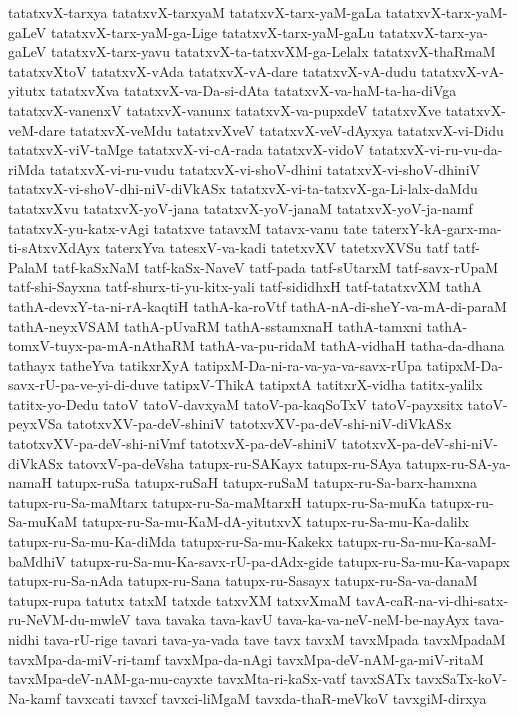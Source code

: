 {tatatxvX-tarxya
tatatxvX-tarxyaM
tatatxvX-tarx-yaM-gaLa
tatatxvX-tarx-yaM-gaLeV
tatatxvX-tarx-yaM-ga-Lige
tatatxvX-tarx-yaM-gaLu
tatatxvX-tarx-ya-gaLeV
tatatxvX-tarx-yavu
tatatxvX-ta-tatxvXM-ga-Lelalx
tatatxvX-thaRmaM
tatatxvXtoV
tatatxvX-vAda
tatatxvX-vA-dare
tatatxvX-vA-dudu
tatatxvX-vA-yitutx
tatatxvXva
tatatxvX-va-Da-si-dAta
tatatxvX-va-haM-ta-ha-diVga
tatatxvX-vanenxV
tatatxvX-vanunx
tatatxvX-va-pupxdeV
tatatxvXve
tatatxvX-veM-dare
tatatxvX-veMdu
tatatxvXveV
tatatxvX-veV-dAyxya
tatatxvX-vi-Didu
tatatxvX-viV-taMge
tatatxvX-vi-cA-rada
tatatxvX-vidoV
tatatxvX-vi-ru-vu-da-riMda
tatatxvX-vi-ru-vudu
tatatxvX-vi-shoV-dhini
tatatxvX-vi-shoV-dhiniV
tatatxvX-vi-shoV-dhi-niV-diVkASx
tatatxvX-vi-ta-tatxvX-ga-Li-lalx-daMdu
tatatxvXvu
tatatxvX-yoV-jana
tatatxvX-yoV-janaM
tatatxvX-yoV-ja-namf
tatatxvX-yu-katx-vAgi
tatatxve
tatavxM
tatavx-vanu
tate
taterxY-kA-garx-ma-ti-sAtxvXdAyx
taterxYva
tatesxV-va-kadi
tatetxvXV
tatetxvXVSu
tatf
tatf-PalaM
tatf-kaSxNaM
tatf-kaSx-NaveV
tatf-pada
tatf-sUtarxM
tatf-savx-rUpaM
tatf-shi-Sayxna
tatf-shurx-ti-yu-kitx-yali
tatf-sididhxH
tatf-tatatxvXM
tathA
tathA-devxY-ta-ni-rA-kaqtiH
tathA-ka-roVtf
tathA-nA-di-sheY-va-mA-di-paraM
tathA-neyxVSAM
tathA-pUvaRM
tathA-sstamxnaH
tathA-tamxni
tathA-tomxV-tuyx-pa-mA-nAthaRM
tathA-va-pu-ridaM
tathA-vidhaH
tatha-da-dhana
tathayx
tatheYva
tatikxrXyA
tatipxM-Da-ni-ra-va-ya-va-savx-rUpa
tatipxM-Da-savx-rU-pa-ve-yi-di-duve
tatipxV-ThikA
tatipxtA
tatitxrX-vidha
tatitx-yalilx
tatitx-yo-Dedu
tatoV
tatoV-davxyaM
tatoV-pa-kaqSoTxV
tatoV-payxsitx
tatoV-peyxVSa
tatotxvXV-pa-deV-shiniV
tatotxvXV-pa-deV-shi-niV-diVkASx
tatotxvXV-pa-deV-shi-niVmf
tatotxvX-pa-deV-shiniV
tatotxvX-pa-deV-shi-niV-diVkASx
tatovxV-pa-deVsha
tatupx-ru-SAKayx
tatupx-ru-SAya
tatupx-ru-SA-ya-namaH
tatupx-ruSa
tatupx-ruSaH
tatupx-ruSaM
tatupx-ru-Sa-barx-hamxna
tatupx-ru-Sa-maMtarx
tatupx-ru-Sa-maMtarxH
tatupx-ru-Sa-muKa
tatupx-ru-Sa-muKaM
tatupx-ru-Sa-mu-KaM-dA-yitutxvX
tatupx-ru-Sa-mu-Ka-dalilx
tatupx-ru-Sa-mu-Ka-diMda
tatupx-ru-Sa-mu-Kakekx
tatupx-ru-Sa-mu-Ka-saM-baMdhiV
tatupx-ru-Sa-mu-Ka-savx-rU-pa-dAdx-gide
tatupx-ru-Sa-mu-Ka-vapapx
tatupx-ru-Sa-nAda
tatupx-ru-Sana
tatupx-ru-Sasayx
tatupx-ru-Sa-va-danaM
tatupx-rupa
tatutx
tatxM
tatxde
tatxvXM
tatxvXmaM
tavA-caR-na-vi-dhi-satx-ru-NeVM-du-mwleV
tava
tavaka
tava-kavU
tava-ka-va-neV-neM-be-nayAyx
tava-nidhi
tava-rU-rige
tavari
tava-ya-vada
tave
tavx
tavxM
tavxMpada
tavxMpadaM
tavxMpa-da-miV-ri-tamf
tavxMpa-da-nAgi
tavxMpa-deV-nAM-ga-miV-ritaM
tavxMpa-deV-nAM-ga-mu-cayxte
tavxMta-ri-kaSx-vatf
tavxSATx
tavxSaTx-koV-Na-kamf
tavxcati
tavxcf
tavxci-liMgaM
tavxda-thaR-meVkoV
tavxgiM-dirxya
}
